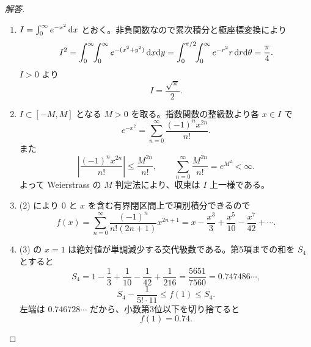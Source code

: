 \begin{proof}[解答]
\begin{enumerate}
  \item[(1)] $I=\int_0^\infty e^{-x^2}\,\mathrm{d} x$ とおく。非負関数なので累次積分と極座標変換により
  \[
  I^2=\int_0^\infty\!\!\int_0^\infty e^{-(x^2+y^2)}\,\mathrm{d} x\mathrm{d} y
  =\int_0^{\pi/2}\!\!\int_0^\infty e^{-r^2}r\,\mathrm{d} r\mathrm{d}\theta
  =\frac{\pi}{4}.
  \]
  $I>0$ より
  \[
  I=\frac{\sqrt{\pi}}{2}.
  \]

  \item[(2)] $I\subset[-M,M]$ となる $M>0$ を取る。指数関数の整級数より各 $x\in I$ で
  \[
  e^{-x^2}=\sum_{n=0}^\infty\frac{(-1)^nx^{2n}}{n!}.
  \]
  また
  \[
  \left|\frac{(-1)^nx^{2n}}{n!}\right|
  \le\frac{M^{2n}}{n!},\qquad
  \sum_{n=0}^\infty\frac{M^{2n}}{n!}=e^{M^2}<\infty.
  \]
  よって Weierstrass の $M$ 判定法により、収束は $I$ 上一様である。

  \item[(3)] (2) により $0$ と $x$ を含む有界閉区間上で項別積分できるので
  \[
  f(x)=\sum_{n=0}^\infty
  \frac{(-1)^n}{n!(2n+1)}x^{2n+1}
  =x-\frac{x^3}{3}+\frac{x^5}{10}-\frac{x^7}{42}+\cdots.
  \]

  \item[(4)] (3) の $x=1$ は絶対値が単調減少する交代級数である。第5項までの和を $S_4$ とすると
  \[
  S_4=1-\frac13+\frac1{10}-\frac1{42}+\frac1{216}
  =\frac{5651}{7560}=0.747486\cdots,
  \]
  \[
  S_4-\frac1{5!\cdot11}\le f(1)\le S_4.
  \]
  左端は $0.746728\cdots$ だから、小数第3位以下を切り捨てると
  \[
  f(1)=0.74.
  \]
\end{enumerate}
\end{proof}

